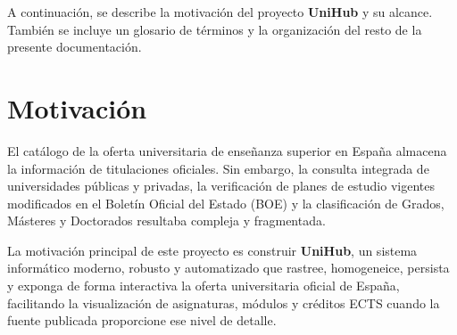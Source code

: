 
A continuación, se describe la motivación del proyecto \textbf{UniHub} y su alcance. También se incluye un glosario de términos y la organización del resto de la presente documentación.

\section{Motivación}
El catálogo de la oferta universitaria de enseñanza superior en España almacena la información de titulaciones oficiales. Sin embargo, la consulta integrada de universidades públicas y privadas, la verificación de planes de estudio vigentes modificados en el Boletín Oficial del Estado (BOE) y la clasificación de Grados, Másteres y Doctorados resultaba compleja y fragmentada.

La motivación principal de este proyecto es construir \textbf{UniHub}, un sistema informático moderno, robusto y automatizado que rastree, homogeneice, persista y exponga de forma interactiva la oferta universitaria oficial de España, facilitando la visualización de asignaturas, módulos y créditos ECTS cuando la fuente publicada proporcione ese nivel de detalle.


